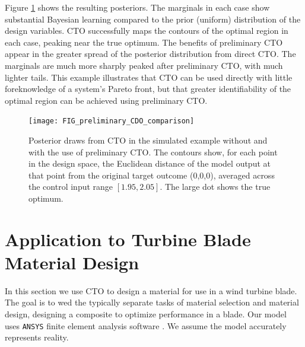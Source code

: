\documentclass[12pt]{article}
\begin{document}
%
Figure \ref{fig:toy_sim_results} shows the resulting posteriors. %
%
The marginals in each case show substantial Bayesian learning compared to the prior (uniform) distribution of the design variables.
%
CTO successfully maps the contours of the optimal region in each case, peaking near the true optimum.
%
The benefits of preliminary CTO appear in the greater spread of the posterior distribution from direct CTO.
%
The marginals are much more sharply peaked after preliminary CTO, with much lighter tails.
%
%
%
This example illustrates that CTO can be used directly with little foreknowledge of a system's Pareto front, but that greater identifiability of the optimal region can be achieved using preliminary CTO.

\begin{figure}
\centering
\texttt{[image: FIG\_preliminary\_CDO\_comparison]}
\caption{Posterior draws from CTO in the simulated example without and with the use of preliminary CTO. The contours show, for each point in the design space, the Euclidean distance of the model output at that point from the original target outcome (0,0,0), averaged across the control input range $[1.95,2.05]$. The large dot shows the true optimum.}
\label{fig:toy_sim_results}
\end{figure}



\section{Application to Turbine Blade Material Design}\label{application}

In this section we use CTO to design a material for use in a wind turbine blade. %
%
The goal is to wed the typically separate tasks of material selection and material design, designing a composite to optimize performance in a blade.
%
Our model uses \texttt{ANSYS} finite element analysis software \citep{ansys}.
We assume the model accurately represents reality.
\end{document}
